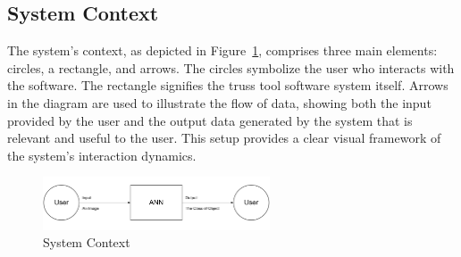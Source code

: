 \documentclass[12pt]{article}
\begin{document}

\subsection{System Context}

The system's context, as depicted in Figure~\ref{Fig_SystemContext}, comprises three main elements: 
circles, a rectangle, and arrows. The circles symbolize the user who interacts with the software. 
The rectangle signifies the truss tool software system itself. 
Arrows in the diagram are used to illustrate the flow of data, showing both the input provided by 
the user and the output data generated by the system that is relevant and useful to the user. 
This setup provides a clear visual framework of the system's interaction dynamics.

\begin{figure}[h!]
\begin{center}
 \includegraphics[width=0.6\textwidth]{System Context.PNG}
\caption{System Context}
\label{Fig_SystemContext} 
\end{center}
\end{figure}
\end{document}

